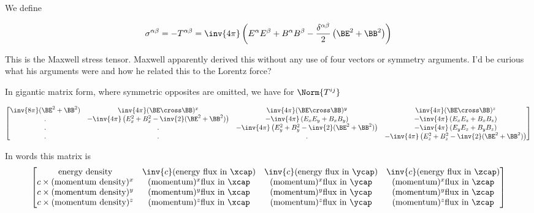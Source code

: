 We define

\begin{equation}\label{eqn:relativisticElectrodynamicsL23:230}
\sigma^{\alpha\beta}
=
-T^{\alpha\beta}
=
 \inv{4\pi} \left(
E^\alpha E^\beta
+B^\alpha B^\beta
- \frac{\delta^{\alpha\beta} }{2}
\left(
\BE^2 + \BB^2 
\right)
\right) 
\end{equation}

This is the Maxwell stress tensor.  Maxwell apparently derived this without any use of four vectors or symmetry arguments.  I'd be curious what his arguments were and how he related this to the Lorentz force?

In gigantic matrix form, where symmetric opposites are omitted, we have for $\Norm{T^{ij}}$

\begin{equation}\label{eqn:relativisticElectrodynamicsL23:250}
\begin{bmatrix}
\inv{8 \pi}(\BE^2 + \BB^2) & \inv{4\pi} (\BE \cross \BB)^x & \inv{4\pi} (\BE \cross \BB)^y & \inv{4\pi} (\BE \cross \BB)^z \\
. 
& -\inv{4 \pi}\left(E_x^2 + B_x^2 - \inv{2}(\BE^2 + \BB^2)\right) 
& -\inv{4 \pi}\left(E_x E_y + B_x B_y \right)
& -\inv{4 \pi}\left(E_x E_z + B_x B_z \right) \\
. & . & -\inv{4 \pi}\left(E_y^2 + B_y^2 - \inv{2}(\BE^2 + \BB^2)\right) & -\inv{4 \pi}\left(E_y E_z + B_y B_z \right) \\
. & . & . & -\inv{4 \pi}\left(E_z^2 + B_z^2 - \inv{2}(\BE^2 + \BB^2)\right) 
\end{bmatrix}
\end{equation}

In words this matrix is
\begin{equation}\label{eqn:relativisticElectrodynamicsL23:270}
\begin{bmatrix}
\text{energy density} & \inv{c} (\text{energy flux in $\xcap$}) & \inv{c} (\text{energy flux in $\ycap$}) & \inv{c} (\text{energy flux in $\zcap$}) \\
c \times (\text{momentum density})^x
& (\text{momentum})^x \text{flux in $\xcap$}
& (\text{momentum})^x \text{flux in $\ycap$}
& (\text{momentum})^x \text{flux in $\zcap$} \\
c \times (\text{momentum density})^y
& (\text{momentum})^y \text{flux in $\xcap$}
& (\text{momentum})^y \text{flux in $\ycap$}
& (\text{momentum})^y \text{flux in $\zcap$} \\
c \times (\text{momentum density})^z
& (\text{momentum})^z \text{flux in $\xcap$}
& (\text{momentum})^z \text{flux in $\ycap$}
& (\text{momentum})^z \text{flux in $\zcap$} \\
\end{bmatrix}
\end{equation}

